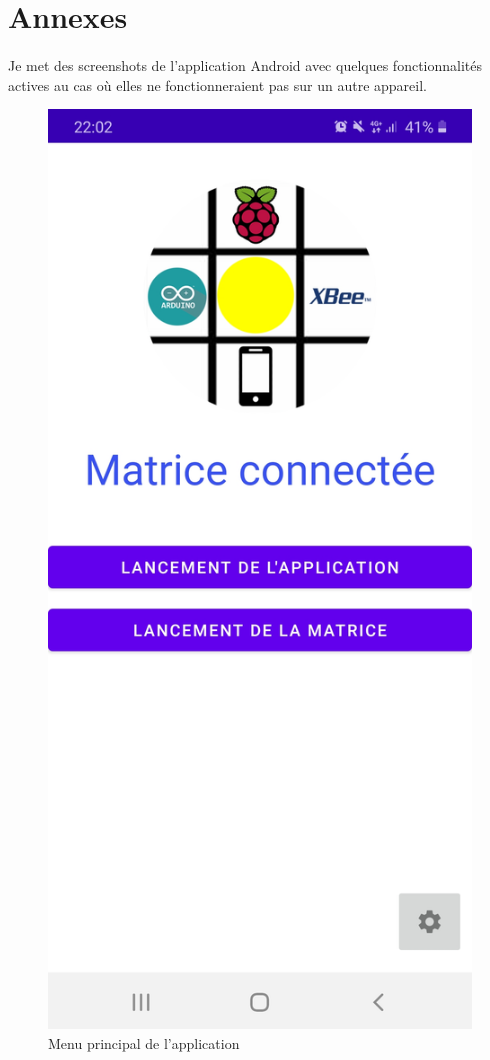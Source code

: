 \documentclass[a4paper,12pt]{report}
\begin{document}
	\section{Annexes}
		\paragraph*{}
		Je met des screenshots de l'application Android avec quelques fonctionnalités actives au cas où elles ne fonctionneraient pas sur un autre appareil.
		
		\begin{figure}[H]
			\centering
				\includegraphics[scale=0.14]{images/menu.jpg}
				\caption{Menu principal de l'application}
		\end{figure}
		
\end{document}
